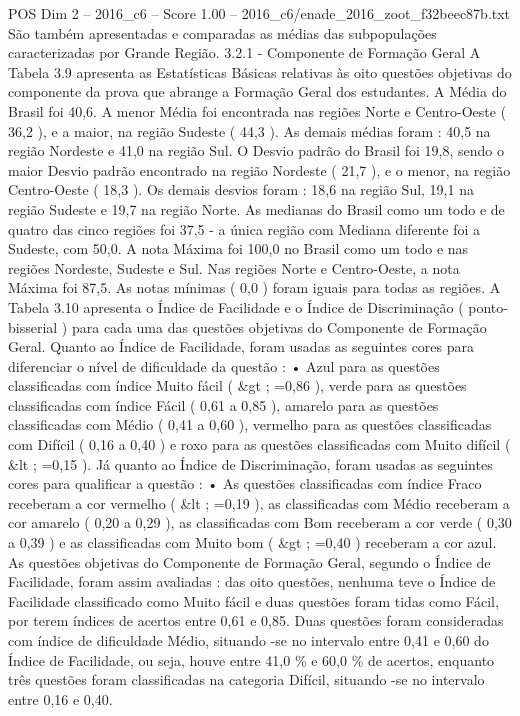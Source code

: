 \begin{textsample}{POS Dim 2 – 2016\_c6 – Score 1.00 – 2016\_c6/enade\_2016\_zoot\_f32beec87b.txt}
São também apresentadas e comparadas as médias das subpopulações caracterizadas por Grande Região. 3.2.1 - Componente de Formação Geral A Tabela 3.9 apresenta as Estatísticas Básicas relativas às oito questões objetivas do componente da prova que abrange a Formação Geral dos estudantes.
A Média do Brasil foi 40,6.
A menor Média foi encontrada nas regiões Norte e Centro-Oeste ( 36,2 ), e a maior, na região Sudeste ( 44,3 ).
As demais médias foram : 40,5 na região Nordeste e 41,0 na região Sul.
O Desvio padrão do Brasil foi 19,8, sendo o maior Desvio padrão encontrado na região Nordeste ( 21,7 ), e o menor, na região Centro-Oeste ( 18,3 ).
Os demais desvios foram : 18,6 na região Sul, 19,1 na região Sudeste e 19,7 na região Norte.
As medianas do Brasil como um todo e de quatro das cinco regiões foi 37,5 - a única região com Mediana diferente foi a Sudeste, com 50,0.
A nota Máxima foi 100,0 no Brasil como um todo e nas regiões Nordeste, Sudeste e Sul.
Nas regiões Norte e Centro-Oeste, a nota Máxima foi 87,5.
As notas mínimas ( 0,0 ) foram iguais para todas as regiões.
A Tabela 3.10 apresenta o Índice de Facilidade e o Índice de Discriminação ( ponto-bisserial ) para cada uma das questões objetivas do Componente de Formação Geral.
Quanto ao Índice de Facilidade, foram usadas as seguintes cores para diferenciar o nível de dificuldade da questão : • Azul para as questões classificadas com índice Muito fácil ( \&gt ; =0,86 ), verde para as questões classificadas com índice Fácil ( 0,61 a 0,85 ), amarelo para as questões classificadas com Médio ( 0,41 a 0,60 ), vermelho para as questões classificadas com Difícil ( 0,16 a 0,40 ) e roxo para as questões classificadas com Muito difícil ( \&lt ; =0,15 ).
Já quanto ao Índice de Discriminação, foram usadas as seguintes cores para qualificar a questão : • As questões classificadas com índice Fraco receberam a cor vermelho ( \&lt ; =0,19 ), as classificadas com Médio receberam a cor amarelo ( 0,20 a 0,29 ), as classificadas com Bom receberam a cor verde ( 0,30 a 0,39 ) e as classificadas com Muito bom ( \&gt ; =0,40 ) receberam a cor azul.
As questões objetivas do Componente de Formação Geral, segundo o Índice de Facilidade, foram assim avaliadas : das oito questões, nenhuma teve o Índice de Facilidade classificado como Muito fácil e duas questões foram tidas como Fácil, por terem índices de acertos entre 0,61 e 0,85.
Duas questões foram consideradas com índice de dificuldade Médio, situando -se no intervalo entre 0,41 e 0,60 do Índice de Facilidade, ou seja, houve entre 41,0 \% e 60,0 \% de acertos, enquanto três questões foram classificadas na categoria Difícil, situando -se no intervalo entre 0,16 e 0,40.

\end{textsample}

